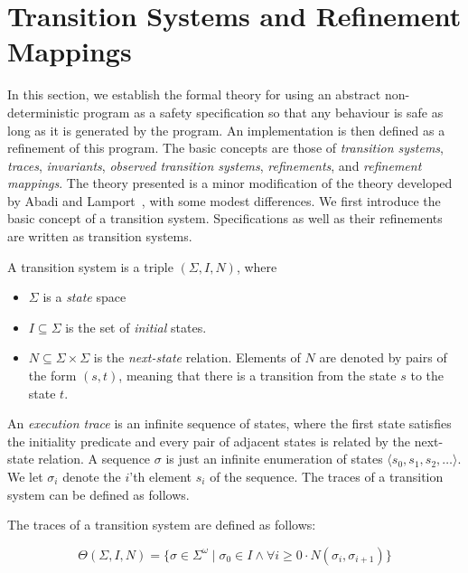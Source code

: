 
\section{Transition Systems and Refinement Mappings}
\label{transition-systems}

In this section,  we establish the  formal theory for using an abstract
non-deterministic program as   a safety specification so  that any
behaviour is safe as long as it is generated by the program.  An implementation
is then defined as  a refinement of  this program.  The basic concepts
are those of {\em transition systems}, {\em traces}, {\em invariants},
{\em  observed  transition   systems},   {\em refinements},   and {\em
  refinement mappings}.  The  theory presented is a minor modification
of the theory developed by Abadi and Lamport~\cite{AL:Mappings}, 
with some modest differences.     We first introduce   the basic concept of  a
transition system.  Specifications as  well as their refinements
are written as transition systems.

\begin{definition}
A transition system is a triple $(\Sigma,I,N)$, where

\begin{itemize}

  \item $\Sigma$ is a {\em state} space

  \item $I \subseteq \Sigma$ is the set of {\em initial} states.

  \item $N \subseteq \Sigma \times \Sigma$ is the {\em next-state} relation.
        Elements of $N$ are denoted by pairs of the form $(s,t)$, meaning that
        there is a transition from the state $s$ to the state $t$.

\end{itemize}
\end{definition}

\noindent
An {\em execution trace\/}  is an infinite sequence of
states,  where  the first state  satisfies  the initiality predicate and
every pair  of adjacent states is  related  by the  next-state
relation.  A 
sequence $\sigma$  is just an infinite enumeration  of states $\langle s_0,
s_1,  s_2, \ldots \rangle$.     We  let $\sigma_i$ denote  the  $i$'th
element $s_i$  of the  sequence.    The traces of   a transition
system can be defined as follows.

\begin{definition}[Traces]
\label{def-traces}
  The traces of a transition system are defined as follows:

\[
\Theta(\Sigma,I,N) = \{ \sigma \in \Sigma^{\omega} \mid 
                          \sigma_0 \in I \wedge
                          \forall i \ge 0 \cdot N(\sigma_i,\sigma_{i+1}) \}
\] 
\end{definition}

